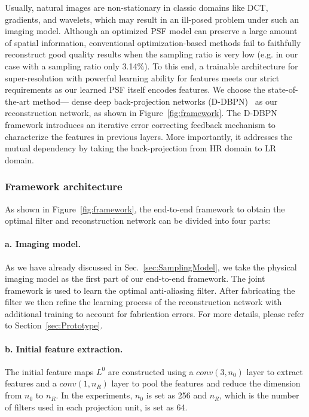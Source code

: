 Usually, natural images are non-stationary in classic domains like
DCT, gradients, and wavelets, which may result in an ill-posed problem
under such an imaging model. Although an optimized PSF model can
preserve a large amount of spatial information, conventional
optimization-based methods fail to faithfully reconstruct good quality
results when the sampling ratio is very low (e.g. in our case with a
sampling ratio only 3.14$\%$). To this end, a trainable architecture
for super-resolution with powerful learning ability for features meets
our strict requirements as our learned PSF itself encodes features. We
choose the state-of-the-art method--- dense deep back-projection
networks (D-DBPN)~\cite{haris2018deep} as our reconstruction network,
as shown in Figure~\ref{fig:framework}. The D-DBPN framework
introduces an iterative error correcting feedback mechanism to
characterize the features in previous layers. More importantly, it
addresses the mutual dependency by taking the back-projection from HR
domain to LR domain.

\subsubsection{Framework architecture}
As shown in Figure~\ref{fig:framework}, the end-to-end framework 
to obtain the optimal filter and reconstruction network can
be divided into four parts: 

\paragraph{a. Imaging model.} As we have already discussed in Sec.~\ref{sec:SamplingModel},
we take the physical imaging model as the first part of our end-to-end
framework. The joint framework is used to learn the optimal
anti-aliasing filter.  After fabricating the filter we then refine the
learning process of the reconstruction network with additional
training to account for fabrication errors. For more details, please
refer to Section~\ref{sec:Prototype}.

\paragraph{b. Initial feature extraction.}
The initial feature maps $L^0$ are constructed using a $conv(3, n_0)$
layer to extract features and a $conv(1, n_R)$ layer to pool the
features and reduce the dimension from $n_0$ to $n_R$. In the
experiments, $n_0$ is set as 256 and $n_R$, which is the number of
filters used in each projection unit, is set as 64.

